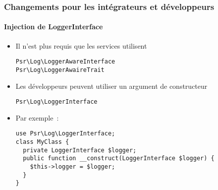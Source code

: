 %

\begin{frame}[fragile]
	\frametitle{Changements pour les intégrateurs et développeurs}
	\framesubtitle{Injection de LoggerInterface}


	\begin{itemize}
		\item Il n'est plus requis que les services utilisent
\begin{lstlisting}
Psr\Log\LoggerAwareInterface
Psr\Log\LoggerAwaireTrait
\end{lstlisting}
		\item Les développeurs peuvent utiliser un argument de constructeur
\begin{lstlisting}
Psr\Log\LoggerInterface
\end{lstlisting}
		\item Par exemple~:
\begin{lstlisting}
use Psr\Log\LoggerInterface;
class MyClass {
  private LoggerInterface $logger;
  public function __construct(LoggerInterface $logger) {
    $this->logger = $logger;
  }
}
\end{lstlisting}
	\end{itemize}

\end{frame}

